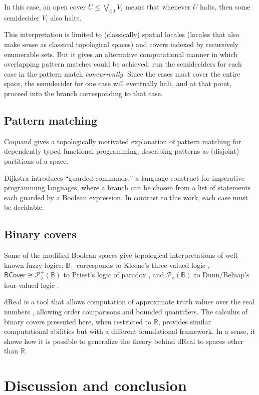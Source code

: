 \documentclass[conference]{IEEEtran}
\newcommand{\PLower}{\mathcal{P}_\lozenge}
\newcommand{\R}{\mathbb{R}}
\newcommand{\bool}{\mathbb{B}}
\newcommand{\BCover}{\mathsf{BCover}}
\begin{document}
In this case, an open cover $U \le \bigvee_{i : I} V_i$ means that whenever $U$ halts, then some semidecider $V_i$ also halts.

This interpretation is limited to (classically) spatial locales (locales that also make sense as classical topological spaces) and covers indexed by recursively enumerable sets. But it gives an alternative computational manner in which overlapping pattern matches could be achieved: run the semideciders for each case in the pattern match \emph{concurrently}. Since the cases must cover the entire space, the semidecider for one case will eventually halt, and at that point, proceed into the branch corresponding to that case.

\subsection{Pattern matching}

Coquand \cite{coquand1992} gives a topologically motivated explanation of pattern matching for dependently typed functional programming, describing patterns as (disjoint) partitions of a space.

Dijkstra \cite{dijkstra} introduces ``guarded commands,'' a language construct for imperative programming languages, where a branch can be chosen from a list of statements each guarded by a Boolean expression. In contrast to this work, each case must be decidable.

\subsection{Binary covers}

Some of the modified Boolean spaces give topological interpretations of well-known fuzzy logics: $\bool_\bot$ corresponds to Kleene's three-valued logic \cite{kleenemetamathematics}, $\BCover \cong \PLower^+(\bool)$ to Priest's logic of paradox \cite{priest}, and $\PLower(\bool)$ to Dunn/Belnap's four-valued logic \cite{sep-logic-manyvalued}.

dReal is a tool that allows computation of approximate truth values over the real numbers \cite{dReal}, allowing order comparisons and bounded quantifiers. The calculus of binary covers presented here, when restricted to $\R$, provides similar computational abilities but with a different foundational framework. In a sense, it shows how it is possible to generalize the theory behind dReal to spaces other than $\R$.

\section{Discussion and conclusion}
\end{document}

